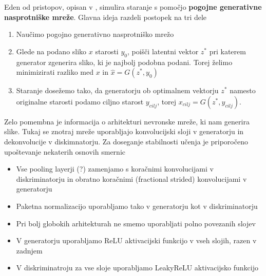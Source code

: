 \documentclass[12pt,a4paper,twoside]{article}
\theoremstyle{definition} %
\theoremstyle{plain} %
\numberwithin{equation}{section}  %
\begin{document}
Eden od pristopov, opisan v \cite{antipov2017face}, simulira staranje s pomočjo \textbf{pogojne  generativne  nasprotniške mreže}. 
Glavna ideja razdeli postopek na tri dele
\begin{enumerate}
\item Naučimo pogojno generativno nasprotniško mrežo
\item Glede na podano sliko $x$ starosti $y_0$, poišči latentni vektor $z^*$ pri katerem generator zgenerira sliko, ki je najbolj podobna podani. Torej želimo minimizirati razliko med $x$ in $\hat{x} = G(z^*,y_0)$
\item Staranje dosežemo tako, da generatorju ob optimalnem vektorju $z^*$ namesto originalne starosti podamo ciljno starost $y_{cilj}$, torej $x_{cilj} = G(z^*,y_{cilj})$. 
\end{enumerate}
Zelo pomembna je informacija o arhitekturi nevronske mreže, ki nam generira slike. Tukaj se znotraj mreže uporabljajo konvolucijski sloji v generatorju in dekonvolucije v diskimnatorju. Za doseganje stabilnosti učenja je priporočeno upoštevanje nekaterih osnovih smernic \cite{radford2015unsupervised}
\begin{itemize}
\item Vse pooling layerji (?) zamenjamo s koračnimi konvolucijami v diskriminatorju in obratno koračnimi (fractional strided) konvolucijami v generatorju
\item Paketna normalizacijo uporabljamo tako v generatorju kot v diskriminatorju
\item Pri bolj globokih arhitekturah ne smemo uporabljati polno povezanih slojev
\item V generatorju uporabljamo ReLU aktivacijski funkcijo v vseh slojih, razen v zadnjem
\item V diskriminatroju za vse sloje uporabljamo LeakyReLU aktivacijsko funkcijo
\end{itemize} 
\end{document}
